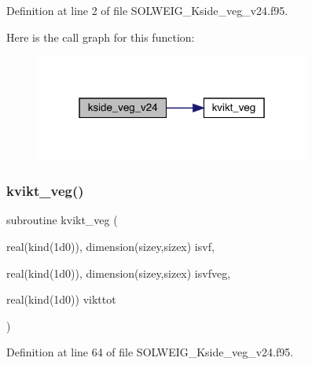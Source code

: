 Definition at line 2 of file S\+O\+L\+W\+E\+I\+G\+\_\+\+Kside\+\_\+veg\+\_\+v24.\+f95.

Here is the call graph for this function\+:\nopagebreak
\begin{figure}[H]
\begin{center}
\leavevmode
\includegraphics[width=256pt]{_s_o_l_w_e_i_g___kside__veg__v24_8f95_a3e008823145af180ffc924782b480545_cgraph}
\end{center}
\end{figure}
\mbox{\label{_s_o_l_w_e_i_g___kside__veg__v24_8f95_a9ed9001e5e9b8790be486a97a1cde4f9}} 
\subsubsection{\texorpdfstring{kvikt\+\_\+veg()}{kvikt\_veg()}}
{\footnotesize\ttfamily subroutine kvikt\+\_\+veg (\begin{DoxyParamCaption}\item[{real(kind(1d0)), dimension(sizey,sizex)}]{isvf,  }\item[{real(kind(1d0)), dimension(sizey,sizex)}]{isvfveg,  }\item[{real(kind(1d0))}]{vikttot }\end{DoxyParamCaption})}



Definition at line 64 of file S\+O\+L\+W\+E\+I\+G\+\_\+\+Kside\+\_\+veg\+\_\+v24.\+f95.

